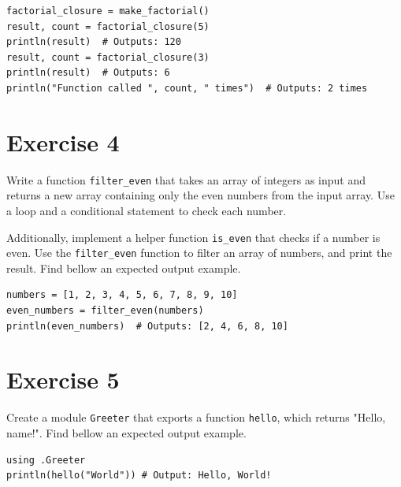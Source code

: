 \documentclass{article}
\begin{document}
\begin{verbatim}
factorial_closure = make_factorial()
result, count = factorial_closure(5)
println(result)  # Outputs: 120
result, count = factorial_closure(3)
println(result)  # Outputs: 6
println("Function called ", count, " times")  # Outputs: 2 times
\end{verbatim}

\section*{Exercise 4}

Write a function \texttt{filter\_even} that takes an array of integers as input and returns a new array containing only the even numbers from the input array. Use a loop and a conditional statement to check each number.

Additionally, implement a helper function \texttt{is\_even} that checks if a number is even. Use the \texttt{filter\_even} function to filter an array of numbers, and print the result. Find bellow an expected output example.

\begin{verbatim}
numbers = [1, 2, 3, 4, 5, 6, 7, 8, 9, 10]
even_numbers = filter_even(numbers)
println(even_numbers)  # Outputs: [2, 4, 6, 8, 10]
\end{verbatim}

\section*{Exercise 5}

Create a module \texttt{Greeter} that exports a function \texttt{hello}, which returns "Hello, name!". Find bellow an expected output example.

\begin{verbatim}
using .Greeter
println(hello("World")) # Output: Hello, World!
\end{verbatim}
\end{document}
